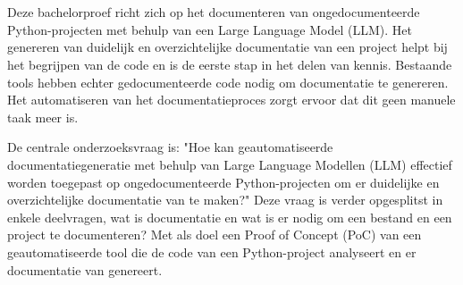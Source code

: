 
%
%
%
%
%


\chapter*{}

Deze bachelorproef richt zich op het documenteren van ongedocumenteerde\\ Python-projecten met behulp van een Large Language Model (LLM).
Het genereren van duidelijk en overzichtelijke documentatie van een project helpt bij het begrijpen van de code en is de eerste stap in het delen van kennis.
Bestaande tools hebben echter gedocumenteerde code nodig om documentatie te genereren. 
Het automatiseren van het documentatieproces zorgt ervoor dat dit geen manuele taak meer is.  

De centrale onderzoeksvraag is: "Hoe kan geautomatiseerde documentatiegeneratie met behulp van Large Language Modellen (LLM) effectief worden toegepast op ongedocumenteerde Python-projecten om er duidelijke en overzichtelijke documentatie van te maken?" 
Deze vraag is verder opgesplitst in enkele deelvragen, wat is documentatie en wat is er nodig om een bestand en een project te documenteren?
Met als doel een Proof of Concept (PoC) van een geautomatiseerde tool die de code van een Python-project analyseert en er documentatie van genereert.

